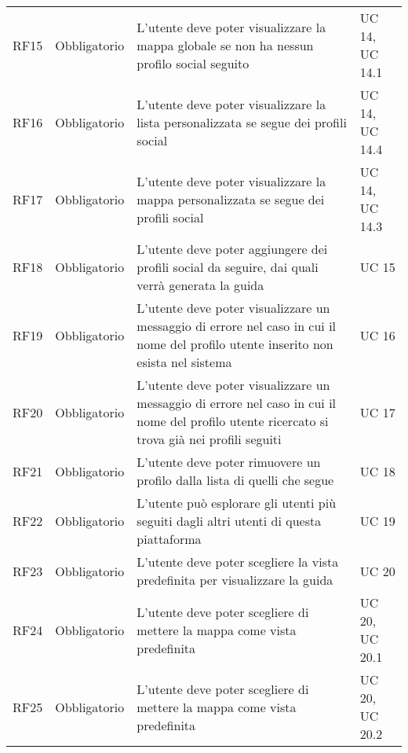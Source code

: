 {\begin{longtable}{C{.257\freewidth} C{.257\freewidth} C{.257\freewidth} C{.257\freewidth}}
      RF15 & Obbligatorio & L'utente deve poter visualizzare la mappa globale se non ha nessun profilo social seguito & UC 14, UC 14.1 \\
      RF16 & Obbligatorio & L'utente deve poter visualizzare la lista personalizzata se segue dei profili social & UC 14, UC 14.4 \\
      RF17 & Obbligatorio & L'utente deve poter visualizzare la mappa personalizzata se segue dei profili social & UC 14, UC 14.3 \\
      RF18 & Obbligatorio & L'utente deve poter aggiungere dei profili social da seguire, dai quali verrà generata la guida & UC 15 \\
      RF19 & Obbligatorio & L'utente deve poter visualizzare un messaggio di errore nel caso in cui il nome del profilo utente inserito non esista nel sistema & UC 16 \\
      RF20 & Obbligatorio & L'utente deve poter visualizzare un messaggio di errore nel caso in cui il nome del profilo utente ricercato si trova già nei profili seguiti & UC 17 \\
      RF21 & Obbligatorio & L'utente deve poter rimuovere un profilo dalla lista di quelli che segue & UC 18 \\
      RF22 & Obbligatorio & L'utente può esplorare gli utenti più seguiti dagli altri utenti di questa piattaforma & UC 19 \\
      RF23 & Obbligatorio & L'utente deve poter scegliere la vista predefinita per visualizzare la guida & UC 20 \\
      RF24 & Obbligatorio & L'utente deve poter scegliere di mettere la mappa come vista predefinita & UC 20, UC 20.1 \\
      RF25 & Obbligatorio & L'utente deve poter scegliere di mettere la mappa come vista predefinita & UC 20, UC 20.2 \\	   
      \bottomrule
      \end{longtable}
}

